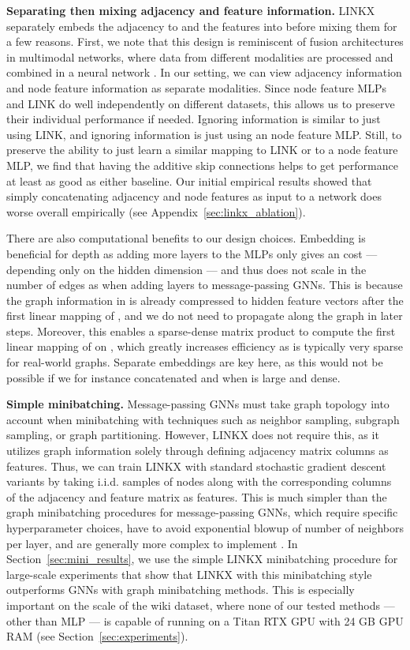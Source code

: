 \documentclass{article}
\newcommand{\myparagraph}[1]{\noindent \textbf{#1}}
\begin{document}
\myparagraph{Separating then mixing adjacency and feature information.} LINKX separately embeds the adjacency  to  and the features  into  before mixing them for a few reasons. First, we note that this design is reminiscent of fusion architectures in multimodal networks, where data from different modalities are processed and combined in a neural network \cite{gadzicki2020early, zeng2019deep}. In our setting, we can view adjacency information and node feature information as separate modalities. Since node feature MLPs and LINK do well independently on different datasets, this allows us to preserve their individual performance if needed. Ignoring  information is similar to just using LINK, and ignoring  information is just using an node feature MLP. Still, to preserve the ability to just learn a similar mapping to LINK or to a node feature MLP, we find that having the additive skip connections helps to get performance at least as good as either baseline. Our initial empirical results showed that simply concatenating adjacency and node features as input to a network does worse overall empirically (see Appendix~\ref{sec:linkx_ablation}). 

There are also computational benefits to our design choices.
Embedding  is beneficial for depth as
adding more layers to the MLPs only gives an  cost --- depending only on the hidden dimension  --- and thus does not scale in the number of edges  as when adding layers to message-passing GNNs. This is because the graph information in  is already compressed to hidden feature vectors after the first linear mapping of , and we do not need to propagate along the graph in later steps.
Moreover, this enables a sparse-dense matrix product to compute the first linear mapping of  on , which greatly increases efficiency as  is typically very sparse for real-world graphs. Separate embeddings are key here, as this would not be possible if we for instance concatenated  and  when  is large and dense. 


\myparagraph{Simple minibatching.} Message-passing GNNs must take graph topology into account when minibatching with techniques such as neighbor sampling, subgraph sampling, or graph partitioning. However, LINKX does not require this, as it utilizes graph information solely through defining adjacency matrix columns as features. Thus, we can train LINKX with standard stochastic gradient descent variants by taking i.i.d. samples of nodes along with the corresponding columns of the adjacency and feature matrix as features.
This is much simpler than the graph minibatching procedures for message-passing GNNs, which require specific hyperparameter choices, have to avoid exponential blowup of number of neighbors per layer, and are generally more complex to implement \cite{zeng2019graphsaint}.
In Section~\ref{sec:mini_results}, we use the simple LINKX minibatching procedure for large-scale experiments that show that LINKX with this minibatching style outperforms GNNs with graph minibatching methods. This is especially important on the scale of the wiki dataset, where none of our tested methods --- other than MLP --- is capable of running on a Titan RTX GPU with 24 GB GPU RAM (see Section~\ref{sec:experiments}).
\end{document}

